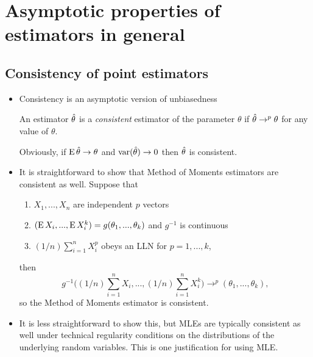 

\chapter{Asymptotic properties of estimators in general}

\section{Consistency of point estimators}

\begin{itemize}

\item Consistency is an asymptotic version of unbiasedness
  \begin{defn}
    An estimator $\hat{\theta}$ is a \emph{consistent} estimator of the
    parameter $\theta$ if $\hat{\theta} \to^p \theta$ for any value of $\theta$.
  \end{defn}

  Obviously, if $\operatorname{E} \hat{\theta} \to \theta$ and $\operatorname{var}(\hat{\theta}) \to 0$ then $\hat{\theta}$ is
  consistent.

\item It is straightforward to show that Method of Moments estimators
  are consistent as well.  Suppose that
  \begin{enumerate}
  \item $X_1,...,X_n$ are independent $p$ vectors
  \item $(\operatorname{E} X_i,...,\operatorname{E} X_i^k) = g(\theta_1,...,\theta_k)$ and $g^{-1}$ is
    continuous
  \item $(1/n) \sum_{i=1}^n X_i^p$ obeys an LLN for $p = 1,...,k$,
  \end{enumerate}
  then
  \begin{equation*}
    g^{-1}\Big( (1/n) \sum_{i=1}^n X_i,..., (1/n) \sum_{i=1}^n X_i^k \Big)
    \to^p (\theta_1,...,\theta_k),
  \end{equation*}
  so the Method of Moments estimator is consistent.

\item It is less straightforward to show this, but MLEs are typically
  consistent as well under technical regularity conditions on the
  distributions of the underlying random variables.  This is one
  justification for using MLE.

\end{itemize}

